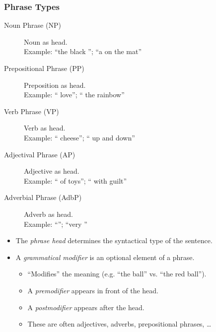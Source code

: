             \subsubsection{Phrase Types} %
            	\begin{description}
            		\item[Noun Phrase (NP)] Noun as head. \\ Example: \enquote{the black }; \enquote{a  on the mat}
            		\item[Prepositional Phrase (PP)] Preposition as head. \\ Example: \enquote{ love}; \enquote{ the rainbow}
            		\item[Verb Phrase (VP)] Verb as head. \\ Example: \enquote{ cheese}; \enquote{ up and down}
            		\item[Adjectival Phrase (AP)] Adjective as head. \\ Example: \enquote{ of toys}; \enquote{ with guilt}
            		\item[Adverbial Phrase (AdbP)] Adverb as head. \\ Example: \enquote{}; \enquote{very }
            	\end{description}
            	\begin{itemize}
            		\item The \textit{phrase head} determines the syntactical type of the sentence.
            		\item A \textit{grammatical modifier} is an optional element of a phrase.
            			\begin{itemize}
            				\item \enquote{Modifies} the meaning (e.g. \enquote{the ball} vs. \enquote{the red ball}).
            				\item A \textit{premodifier} appears in front of the head.
            				\item A \textit{postmodifier} appears after the head.
            				\item These are often adjectives, adverbs, prepositional phrases, \dots
            			\end{itemize}
            	\end{itemize}

